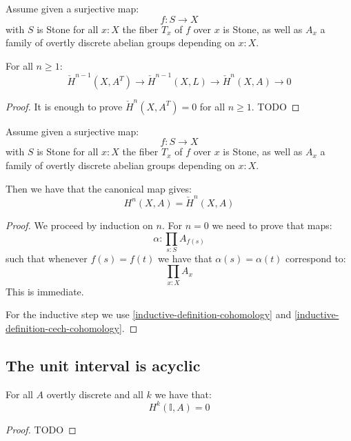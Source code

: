 \begin{lemma}\label{inductive-definition-cech-cohomology}
Assume given a surjective map:
\[f:S\to X\]
with $S$ is Stone for all $x:X$ the fiber $T_x$ of $f$ over $x$ is Stone, as well as $A_x$ a family of overtly discrete abelian groups depending on $x:X$.

For all $n\geq 1$:
\[\check{H}^{n-1}(X,A^T) \to \check{H}^{n-1}(X,L)\to \check{H}^n(X,A)\to 0\]
\end{lemma}

\begin{proof}
It is enough to prove $\check{H}^n(X,A^T) = 0$ for all $n\geq 1$. TODO
\end{proof}

\begin{theorem}
Assume given a surjective map:
\[f:S\to X\]
with $S$ is Stone for all $x:X$ the fiber $T_x$ of $f$ over $x$ is Stone, as well as $A_x$ a family of overtly discrete abelian groups depending on $x:X$.

Then we have that the canonical map gives:
\[H^n(X,A) = \check{H}^n(X,A)\]
\end{theorem}

\begin{proof}
We proceed by induction on $n$. For $n=0$ we need to prove that maps:
\[\alpha:\prod_{s:S}A_{f(s)}\]
such that whenever $f(s)=f(t)$ we have that $\alpha(s) = \alpha(t)$ correspond to:
\[\prod_{x:X}A_x\]
This is immediate.

For the inductive step we use \cref{inductive-definition-cohomology} and \cref{inductive-definition-cech-cohomology}.
\end{proof}

\subsection{The unit interval is acyclic}

\begin{proposition}\label{vanishing-cohomology-interval}
For all $A$ overtly discrete and all $k$ we have that:
\[H^k(\mathbb{I},A) = 0\]
\end{proposition}

\begin{proof}
TODO
\end{proof}

